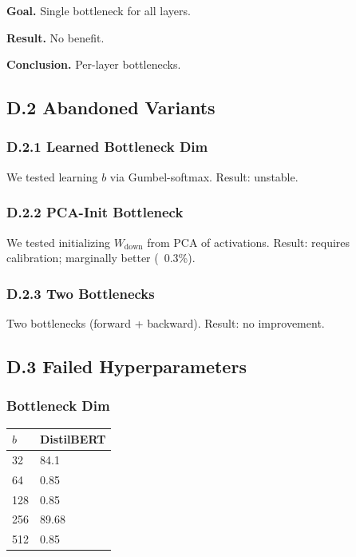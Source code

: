 \textbf{Goal.} Single bottleneck for all layers.

\textbf{Result.} No benefit.

\textbf{Conclusion.} Per-layer bottlenecks.

\subsection{D.2 Abandoned Variants}

\subsubsection{D.2.1 Learned Bottleneck Dim}

We tested learning $b$ via Gumbel-softmax. Result: unstable.

\subsubsection{D.2.2 PCA-Init Bottleneck}

We tested initializing $W_\text{down}$ from PCA of activations. Result: 
requires calibration; marginally better (~0.3\%).

\subsubsection{D.2.3 Two Bottlenecks}

Two bottlenecks (forward + backward). Result: no improvement.

\subsection{D.3 Failed Hyperparameters}

\subsubsection{Bottleneck Dim}

\begin{table}[H]
\centering
\small
\begin{tabular}{ll}
\toprule
\textbf{$b$} & \textbf{DistilBERT} \\
\midrule
32 & 84.1 \\
64 & 0.85 \\
128 & 0.85 \\
256 & 89.68 \\
512 & 0.85 \\
\bottomrule
\end{tabular}
\end{table}

